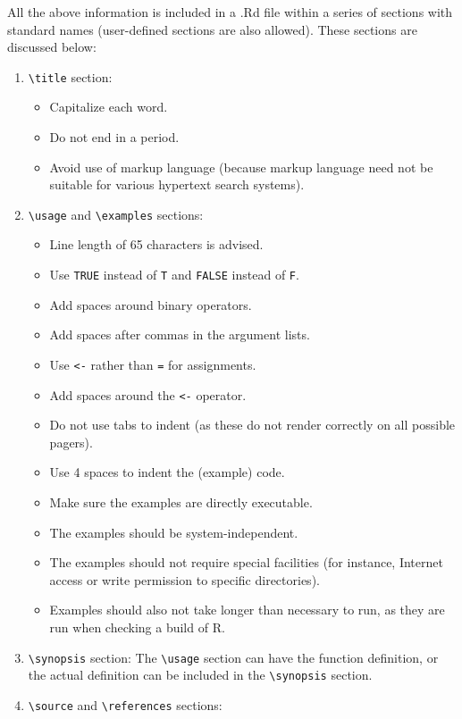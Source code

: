 \documentclass[
]{book}
\providecommand{\tightlist}{%
  \setlength{\itemsep}{0pt}\setlength{\parskip}{0pt}}
\begin{document}
All the above information is included in a .Rd file within a series of sections with standard names (user-defined sections are also allowed). These sections are discussed below:

\begin{enumerate}
\def\labelenumi{\arabic{enumi}.}
\item
  \texttt{\textbackslash{}title} section:

  \begin{itemize}
  \tightlist
  \item
    Capitalize each word.
  \item
    Do not end in a period.
  \item
    Avoid use of markup language (because markup language need not be suitable for various hypertext search systems).
  \end{itemize}
\item
  \texttt{\textbackslash{}usage} and \texttt{\textbackslash{}examples} sections:

  \begin{itemize}
  \tightlist
  \item
    Line length of 65 characters is advised.
  \item
    Use \texttt{TRUE} instead of \texttt{T} and \texttt{FALSE} instead of \texttt{F}.
  \item
    Add spaces around binary operators.
  \item
    Add spaces after commas in the argument lists.
  \item
    Use \texttt{\textless{}-} rather than \texttt{=} for assignments.
  \item
    Add spaces around the \texttt{\textless{}-} operator.
  \item
    Do not use tabs to indent (as these do not render correctly on all possible pagers).
  \item
    Use 4 spaces to indent the (example) code.
  \item
    Make sure the examples are directly executable.
  \item
    The examples should be system-independent.
  \item
    The examples should not require special facilities (for instance, Internet access or write permission to specific directories).
  \item
    Examples should also not take longer than necessary to run, as they are run when checking a build of R.
  \end{itemize}
\item
  \texttt{\textbackslash{}synopsis} section: The \texttt{\textbackslash{}usage} section can have the function definition, or the actual definition can be included in the \texttt{\textbackslash{}synopsis} section.
\item
  \texttt{\textbackslash{}source} and \texttt{\textbackslash{}references} sections:


\end{enumerate}
\end{document}
